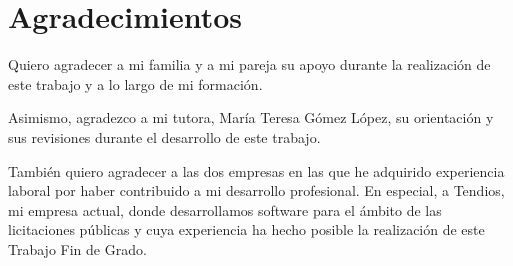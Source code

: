 \cleardoublepage
\chapter*{Agradecimientos}

Quiero agradecer a mi familia y a mi pareja su apoyo durante la realización de
este trabajo y a lo largo de mi formación.

Asimismo, agradezco a mi tutora, María Teresa Gómez López, su orientación y sus
revisiones durante el desarrollo de este trabajo.

También quiero agradecer a las dos empresas en las que he adquirido experiencia
laboral por haber contribuido a mi desarrollo profesional. En especial, a
Tendios, mi empresa actual, donde desarrollamos software para el ámbito de las
licitaciones públicas y cuya experiencia ha hecho posible la realización de
este Trabajo Fin de Grado.
